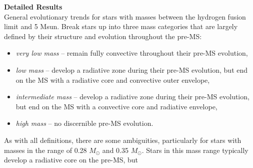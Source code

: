 \textbf{Detailed Results} \\
General evolutionary trends for stars with masses between the hydrogen fusion limit and 5 Msun. Break stars up into three mass categories that are largely defined by their structure and evolution throughout the pre-MS: 
\begin{itemize}
 \item {\it very low mass} -- remain fully convective throughout their pre-MS evolution,
 \item {\it low mass} -- develop a radiative zone during their pre-MS evolution, but end on the MS with a radiative core and convective outer envelope,
 \item {\it intermediate mass} -- develop a radiative zone during their pre-MS evolution, but end on the MS with a convective core and radiative envelope,
 \item {\it high mass} -- no discernible pre-MS evolution.
\end{itemize}
As with all definitions, there are some ambiguities, particularly for stars with masses in the range of 0.28 $M_{\odot}$ and 0.35 $M_{\odot}$. Stars in this mass range typically develop a radiative core on the pre-MS, but 